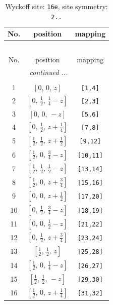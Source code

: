 \documentclass[fleqn,8pt]{jsarticle}
\begin{document}
\begin{longtable}{ccc}
\caption{Wyckoff site: {\tt 16e}, site symmetry: {\tt 2..}}
 \\
 \hline \hline
No. & position & mapping \\ \hline \endfirsthead

\multicolumn{2}{l}{\tablename\ \thetable{}} \\
 \hline \hline
No. & position & mapping \\ \hline \endhead

 \hline \hline
\multicolumn{2}{r}{\footnotesize\it continued ...} \\ \endfoot

 \hline \hline
\multicolumn{2}{r}{} \\ \endlastfoot

1 & $\left[ 0,\, 0,\, z \right]$ & {\tt [1,4]} \\ \hline
2 & $\left[ 0,\, \frac{1}{2},\, \frac{1}{4} - z \right]$ & {\tt [2,3]} \\ \hline
3 & $\left[ 0,\, 0,\, - z \right]$ & {\tt [5,6]} \\ \hline
4 & $\left[ 0,\, \frac{1}{2},\, z + \frac{1}{4} \right]$ & {\tt [7,8]} \\ \hline
5 & $\left[ \frac{1}{2},\, \frac{1}{2},\, z + \frac{1}{2} \right]$ & {\tt [9,12]} \\ \hline
6 & $\left[ \frac{1}{2},\, 0,\, \frac{3}{4} - z \right]$ & {\tt [10,11]} \\ \hline
7 & $\left[ \frac{1}{2},\, \frac{1}{2},\, \frac{1}{2} - z \right]$ & {\tt [13,14]} \\ \hline
8 & $\left[ \frac{1}{2},\, 0,\, z + \frac{3}{4} \right]$ & {\tt [15,16]} \\ \hline
9 & $\left[ 0,\, 0,\, z + \frac{1}{2} \right]$ & {\tt [17,20]} \\ \hline
10 & $\left[ 0,\, \frac{1}{2},\, \frac{3}{4} - z \right]$ & {\tt [18,19]} \\ \hline
11 & $\left[ 0,\, 0,\, \frac{1}{2} - z \right]$ & {\tt [21,22]} \\ \hline
12 & $\left[ 0,\, \frac{1}{2},\, z + \frac{3}{4} \right]$ & {\tt [23,24]} \\ \hline
13 & $\left[ \frac{1}{2},\, \frac{1}{2},\, z \right]$ & {\tt [25,28]} \\ \hline
14 & $\left[ \frac{1}{2},\, 0,\, \frac{1}{4} - z \right]$ & {\tt [26,27]} \\ \hline
15 & $\left[ \frac{1}{2},\, \frac{1}{2},\, - z \right]$ & {\tt [29,30]} \\ \hline
16 & $\left[ \frac{1}{2},\, 0,\, z + \frac{1}{4} \right]$ & {\tt [31,32]} \\
\end{longtable}
\end{document}
